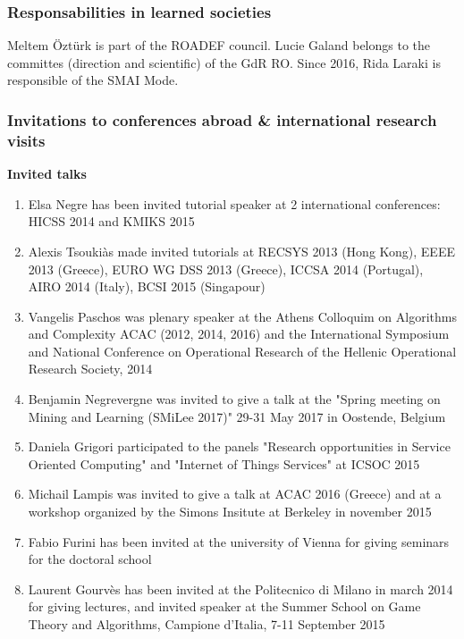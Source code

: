 \documentclass[version=last, pagesize, twoside=semi, DIV=calc, 12pt, a4paper, french, english, bibliography=totoc]{scrartcl}
\begin{document}
\subsubsection{Responsabilities in learned societies}
Meltem \"Ozt\"urk  is part of the ROADEF council. Lucie Galand belongs to the committes (direction and scientific) of the GdR RO. Since 2016, Rida Laraki is responsible of the SMAI Mode. 


\subsubsection{Invitations to conferences abroad \& international research visits}

\noindent \textbf{Invited talks}
\begin{enumerate}
\item Elsa Negre has been invited tutorial speaker at 2 international conferences: HICSS  2014 and KMIKS 2015
\item Alexis Tsouki\`as made invited tutorials at RECSYS 2013 (Hong Kong), EEEE 2013 (Greece),
EURO WG DSS 2013 (Greece), ICCSA 2014 (Portugal), AIRO 2014 (Italy), BCSI 2015
(Singapour)
\item Vangelis Paschos was plenary speaker at the  Athens Colloquim on Algorithms and Complexity ACAC (2012, 2014, 2016)  and the  
    International Symposium and National Conference on Operational Research of the Hellenic Operational Research Society, 2014
\item Benjamin Negrevergne was invited to give a talk at the "Spring meeting on Mining and Learning (SMiLee 2017)" 29-31 May 2017 in Oostende, Belgium
\item Daniela Grigori participated to the panels "Research opportunities in Service Oriented Computing" and "Internet of Things Services" at ICSOC 2015 
\item Michail Lampis was invited to give a talk at ACAC 2016 (Greece) and at a workshop organized by
the Simons Insitute at Berkeley in november 2015
\item Fabio Furini has been invited at the university of Vienna for giving seminars  for the doctoral school
\item Laurent Gourv\`es has been invited at the Politecnico di Milano in march 2014 for giving lectures, and invited
    speaker at the Summer School on Game Theory and Algorithms, Campione d'Italia, 7-11 September 2015

\end{enumerate}
\end{document}
